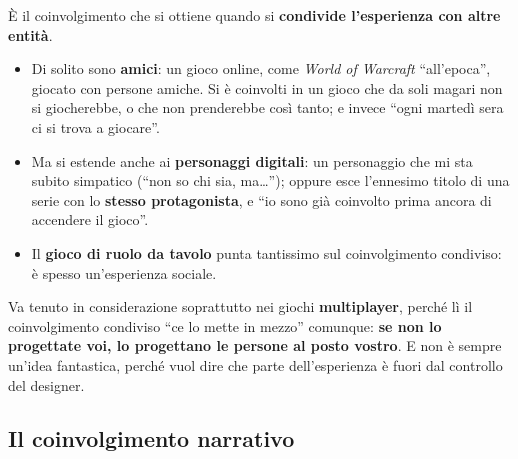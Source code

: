 

È il coinvolgimento che si ottiene quando si \textbf{condivide l'esperienza con
altre entità}.
\begin{itemize}
  \item Di solito sono \textbf{amici}: un gioco online, come \emph{World of
        Warcraft} ``all'epoca'', giocato con persone amiche. Si è coinvolti in
        un gioco che da soli magari non si giocherebbe, o che non prenderebbe
        così tanto; e invece ``ogni martedì sera ci si trova a giocare''.
  \item Ma si estende anche ai \textbf{personaggi digitali}: un personaggio che
        mi sta subito simpatico (``non so chi sia, ma\ldots''); oppure esce
        l'ennesimo titolo di una serie con lo \textbf{stesso protagonista}, e
        ``io sono già coinvolto prima ancora di accendere il gioco''.
  \item Il \textbf{gioco di ruolo da tavolo} punta tantissimo sul coinvolgimento
        condiviso: è spesso un'esperienza sociale.
\end{itemize}
Va tenuto in considerazione soprattutto nei giochi \textbf{multiplayer}, perché lì
il coinvolgimento condiviso ``ce lo mette in mezzo'' comunque: \textbf{se non lo
progettate voi, lo progettano le persone al posto vostro}. E non è sempre
un'idea fantastica, perché vuol dire che parte dell'esperienza è fuori dal
controllo del designer.

\subsection{Il coinvolgimento narrativo}



